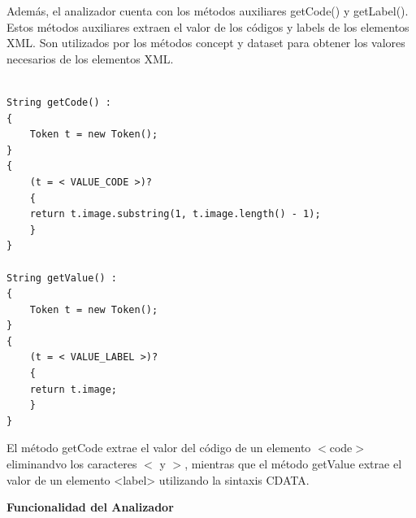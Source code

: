 Además, el analizador cuenta con los métodos auxiliares getCode()  y getLabel(). Estos métodos auxiliares extraen el valor de los códigos y labels de los elementos XML. Son utilizados por los métodos concept y dataset para obtener los valores necesarios de los elementos XML.

\lstset{inputencoding=utf8/latin1}
\begin{lstlisting}

String getCode() :
{
    Token t = new Token();
}
{
    (t = < VALUE_CODE >)?
    {
    return t.image.substring(1, t.image.length() - 1);
    }
}

String getValue() :
{
    Token t = new Token();
}
{
    (t = < VALUE_LABEL >)?
    {
    return t.image;
    }
}  

\end{lstlisting}

El método getCode extrae el valor del código de un elemento $<$code$>$ eliminandvo los caracteres $<$ y $>$, mientras que el método getValue extrae el valor de un elemento <label> utilizando la sintaxis CDATA.

\phantom{text}

\noindent \textbf{Funcionalidad del Analizador}

\phantom{text}




